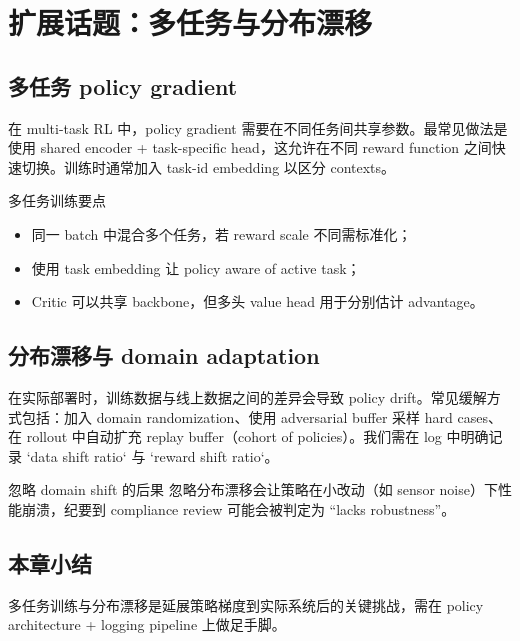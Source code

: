 \section{扩展话题：多任务与分布漂移}
\subsection{多任务 policy gradient}
在 multi-task RL 中，policy gradient 需要在不同任务间共享参数。最常见做法是使用 shared encoder + task-specific head，这允许在不同 reward function 之间快速切换。训练时通常加入 task-id embedding 以区分 contexts。

\begin{knowledgebox}{多任务训练要点}
\begin{itemize}
    \item 同一 batch 中混合多个任务，若 reward scale 不同需标准化；
    \item 使用 task embedding 让 policy aware of active task；
    \item Critic 可以共享 backbone，但多头 value head 用于分别估计 advantage。
\end{itemize}
\end{knowledgebox}

\subsection{分布漂移与 domain adaptation}
在实际部署时，训练数据与线上数据之间的差异会导致 policy drift。常见缓解方式包括：加入 domain randomization、使用 adversarial buffer 采样 hard cases、在 rollout 中自动扩充 replay buffer（cohort of policies）。我们需在 log 中明确记录 `data shift ratio` 与 `reward shift ratio`。

\begin{warningbox}{忽略 domain shift 的后果}
忽略分布漂移会让策略在小改动（如 sensor noise）下性能崩溃，纪要到 compliance review 可能会被判定为 “lacks robustness”。
\end{warningbox}

\subsection{本章小结}
多任务训练与分布漂移是延展策略梯度到实际系统后的关键挑战，需在 policy architecture + logging pipeline 上做足手脚。

